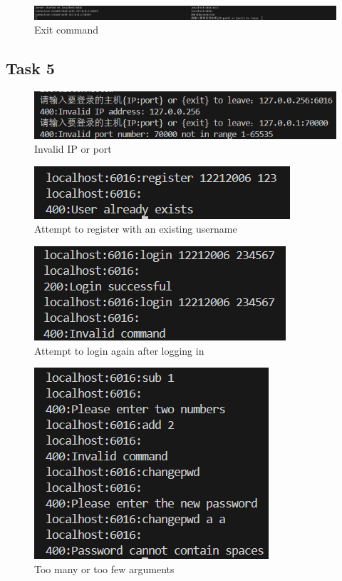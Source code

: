 \documentclass[a4paper,12pt]{article}
\begin{document}
\begin{figure}[H]
    \centering
    \includegraphics[width=\linewidth]{figure/exit.png}
    \caption{Exit command}
\end{figure}

\subsection{Task 5}

\begin{figure}[H]
    \centering
    \includegraphics[width=0.5\linewidth]{figure/exception1.png}
    \caption{Invalid IP or port}
\end{figure}

\begin{figure}[H]
    \centering
    \includegraphics[width=0.5\linewidth]{figure/exception2.png}
    \caption{Attempt to register with an existing username}
\end{figure}

\begin{figure}[H]
    \centering
    \includegraphics[width=0.5\linewidth]{figure/exception3.png}
    \caption{Attempt to login again after logging in}
\end{figure}

\begin{figure}[H]
    \centering
    \includegraphics[width=0.5\linewidth]{figure/exception4.png}
    \caption{Too many or too few arguments}
\end{figure}
\end{document}
